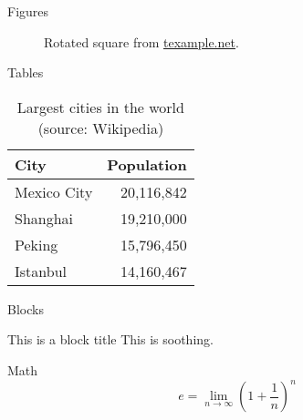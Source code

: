 \documentclass[10pt, compress]{beamer}
\begin{document}
\begin{frame}{Figures}
  \begin{figure}
    \setcounter{density}{20}
    \caption{Rotated square from
    \href{http://www.texample.net/tikz/examples/rotated-polygons/}{texample.net}.}
  \end{figure}
\end{frame}
\begin{frame}{Tables}
  \begin{table}
    \caption{Largest cities in the world (source: Wikipedia)}
    \begin{tabular}{lr}
      \toprule
      City & Population\\
      \midrule
      Mexico City & 20,116,842\\
      Shanghai & 19,210,000\\
      Peking & 15,796,450\\
      Istanbul & 14,160,467\\
      \bottomrule
    \end{tabular}
  \end{table}
\end{frame}
\begin{frame}{Blocks}

  \begin{block}{This is a block title}
    This is soothing.
  \end{block}

\end{frame}
\begin{frame}{Math}
  \begin{equation*}
    e = \lim_{n\to \infty} \left(1 + \frac{1}{n}\right)^n
  \end{equation*}
\end{frame}
\end{document}
